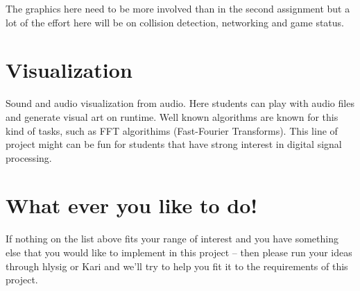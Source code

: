 \documentclass[12pt]{article}
\begin{document}
The graphics here need to be more involved than in the second assignment but a lot of the effort here will be on collision detection, networking and game status.

\section*{Visualization}
Sound and audio visualization from audio. Here students can play with audio files and generate visual art on runtime.
Well known algorithms are known for this kind of tasks, such as FFT algorithims (Fast-Fourier Transforms). This line of project might can
be fun for students that have strong interest in digital signal processing.

\section*{What ever you like to do!}
If nothing on the list above fits your range of interest and you have something else that you would like to implement in this project -- then please run your ideas through hlysig or Kari and we'll try to help you fit it to the requirements of this project.
\end{document}
